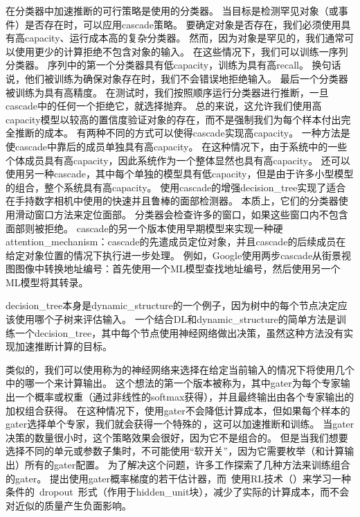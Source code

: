 在分类器中加速推断的可行策略是使用的分类器。
当目标是检测罕见对象（或事件）是否存在时，可以应用\gls{cascade}策略。
要确定对象是否存在，我们必须使用具有高\gls{capacity}、运行成本高的复杂分类器。 
然而，因为对象是罕见的，我们通常可以使用更少的计算拒绝不包含对象的输入。
在这些情况下，我们可以训练一序列分类器。
序列中的第一个分类器具有低\gls{capacity}，训练为具有高\gls{recall}。
换句话说，他们被训练为确保对象存在时，我们不会错误地拒绝输入。
最后一个分类器被训练为具有高精度。
在测试时，我们按照顺序运行分类器进行推断，一旦\gls{cascade}中的任何一个拒绝它，就选择抛弃。
总的来说，这允许我们使用高\gls{capacity}模型以较高的置信度验证对象的存在，而不是强制我们为每个样本付出完全推断的成本。
有两种不同的方式可以使得\gls{cascade}实现高\gls{capacity}。
一种方法是使\gls{cascade}中靠后的成员单独具有高\gls{capacity}。
在这种情况下，由于系统中的一些个体成员具有高\gls{capacity}，因此系统作为一个整体显然也具有高\gls{capacity}。
还可以使用另一种\gls{cascade}，其中每个单独的模型具有低\gls{capacity}，但是由于许多小型模型的组合，整个系统具有高\gls{capacity}。
\citet{Viola01}使用\gls{cascade}的增强\gls{decision_tree}实现了适合在手持数字相机中使用的快速并且鲁棒的面部检测器。
本质上，它们的分类器使用滑动窗口方法来定位面部。
分类器会检查许多的窗口，如果这些窗口内不包含面部则被拒绝。
\gls{cascade}的另一个版本使用早期模型来实现一种硬\gls{attention_mechanism}：\gls{cascade}的先遣成员定位对象，并且\gls{cascade}的后续成员在给定对象位置的情况下执行进一步处理。
例如，Google使用两步\gls{cascade}从街景视图图像中转换地址编号：首先使用一个\gls{ML}模型查找地址编号，然后使用另一个\gls{ML}模型将其转录\citep{Goodfellow+et+al-ICLR2014a}。

\gls{decision_tree}本身是\gls{dynamic_structure}的一个例子，因为树中的每个节点决定应该使用哪个子树来评估输入。
一个结合\gls{DL}和\gls{dynamic_structure}的简单方法是训练一个\gls{decision_tree}，其中每个节点使用神经网络做出决策\citep{guo1992classification}，虽然这种方法没有实现加速推断计算的目标。



类似的，我们可以使用称为的神经网络来选择在给定当前输入的情况下将使用几个中的哪一个来计算输出。
这个想法的第一个版本被称为\citep{Nowlan90,Jacobs-nc91}，其中\gls{gater}为每个专家输出一个概率或权重（通过非线性的\gls{softmax}获得），并且最终输出由各个专家输出的加权组合获得。
在这种情况下，使用\gls{gater}不会降低计算成本，但如果每个样本的\gls{gater}选择单个专家，我们就会获得一个特殊的\,\citep{collobert:2001:rr01-12,collobert:2002}，这可以加速推断和训练。
当\gls{gater}决策的数量很小时，这个策略效果会很好，因为它不是组合的。
但是当我们想要选择不同的单元或参数子集时，不可能使用``软开关''，因为它需要枚举（和计算输出）所有的\gls{gater}配置。
为了解决这个问题，许多工作探索了几种方法来训练组合的\gls{gater}。
\citet{bengio-arxiv13-condcomp}提出使用\gls{gater}概率梯度的若干估计器，而~\citet{Bacon-et-al-RLDM2015,BengioE-et-al-arXiv2015}使用\gls{RL}技术（）来学习一种条件的~\gls{dropout}~形式（作用于\gls{hidden_unit}块），减少了实际的计算成本，而不会对近似的质量产生负面影响。



